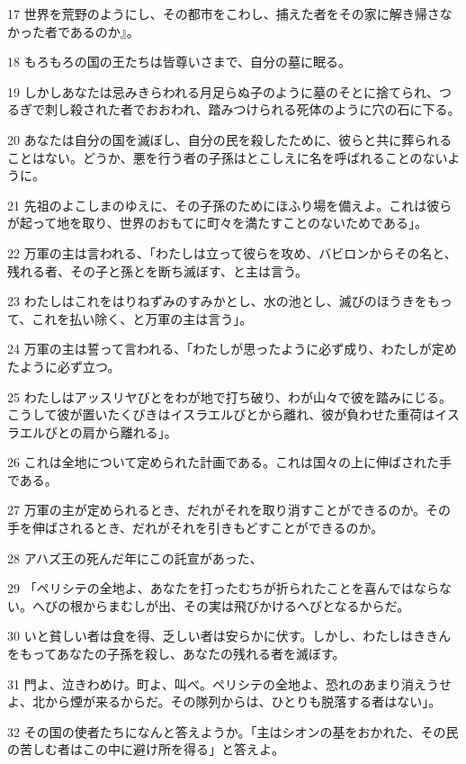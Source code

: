 \par 17 世界を荒野のようにし、その都市をこわし、捕えた者をその家に解き帰さなかった者であるのか』。
\par 18 もろもろの国の王たちは皆尊いさまで、自分の墓に眠る。
\par 19 しかしあなたは忌みきらわれる月足らぬ子のように墓のそとに捨てられ、つるぎで刺し殺された者でおおわれ、踏みつけられる死体のように穴の石に下る。
\par 20 あなたは自分の国を滅ぼし、自分の民を殺したために、彼らと共に葬られることはない。どうか、悪を行う者の子孫はとこしえに名を呼ばれることのないように。
\par 21 先祖のよこしまのゆえに、その子孫のためにほふり場を備えよ。これは彼らが起って地を取り、世界のおもてに町々を満たすことのないためである」。
\par 22 万軍の主は言われる、「わたしは立って彼らを攻め、バビロンからその名と、残れる者、その子と孫とを断ち滅ぼす、と主は言う。
\par 23 わたしはこれをはりねずみのすみかとし、水の池とし、滅びのほうきをもって、これを払い除く、と万軍の主は言う」。
\par 24 万軍の主は誓って言われる、「わたしが思ったように必ず成り、わたしが定めたように必ず立つ。
\par 25 わたしはアッスリヤびとをわが地で打ち破り、わが山々で彼を踏みにじる。こうして彼が置いたくびきはイスラエルびとから離れ、彼が負わせた重荷はイスラエルびとの肩から離れる」。
\par 26 これは全地について定められた計画である。これは国々の上に伸ばされた手である。
\par 27 万軍の主が定められるとき、だれがそれを取り消すことができるのか。その手を伸ばされるとき、だれがそれを引きもどすことができるのか。
\par 28 アハズ王の死んだ年にこの託宣があった、
\par 29 「ペリシテの全地よ、あなたを打ったむちが折られたことを喜んではならない。へびの根からまむしが出、その実は飛びかけるへびとなるからだ。
\par 30 いと貧しい者は食を得、乏しい者は安らかに伏す。しかし、わたしはききんをもってあなたの子孫を殺し、あなたの残れる者を滅ぼす。
\par 31 門よ、泣きわめけ。町よ、叫べ。ペリシテの全地よ、恐れのあまり消えうせよ、北から煙が来るからだ。その隊列からは、ひとりも脱落する者はない」。
\par 32 その国の使者たちになんと答えようか。「主はシオンの基をおかれた、その民の苦しむ者はこの中に避け所を得る」と答えよ。

